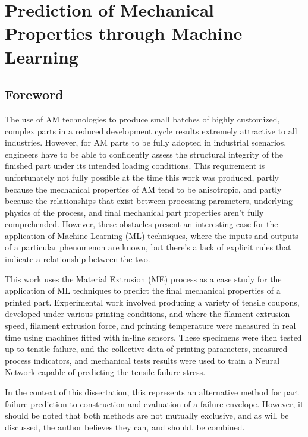 \documentclass[main.tex]{subfiles}
\begin{document}
\chapter{Prediction of Mechanical Properties through Machine Learning} \label{ch:ml}

\section{Foreword} \label{sec:fw_ml}

The use of AM technologies to produce small batches of highly customized, complex parts in a reduced development cycle results extremely attractive to all industries. However, for AM parts to be fully adopted in industrial scenarios, engineers have to be able to confidently assess the structural integrity of the finished part under its intended loading conditions. This requirement is unfortunately not fully possible at the time this work was produced, partly because the mechanical properties of AM tend to be anisotropic, and partly because the relationships that exist between processing parameters, underlying physics of the process, and final mechanical part properties aren't fully comprehended. However, these obstacles present an interesting case for the application of Machine Learning (ML) techniques, where the inputs and outputs of a particular phenomenon are known, but there's a lack of explicit rules that indicate a relationship between the two. 

This work uses the Material Extrusion (ME) process as a case study for the application of ML techniques to predict the final mechanical properties of a printed part. Experimental work involved producing a variety of tensile coupons, developed under various printing conditions, and where the filament extrusion speed, filament extrusion force, and printing temperature were measured in real time using machines fitted with in-line sensors. These specimens were then tested up to tensile failure, and the collective data of printing parameters, measured process indicators, and mechanical tests results were used to train a Neural Network capable of predicting the tensile failure stress.

In the context of this dissertation, this represents an alternative method for part failure prediction to construction and evaluation of a failure envelope. However, it should be noted that both methods are not mutually exclusive, and as will be discussed, the author believes they can, and should, be combined. 
\end{document}
